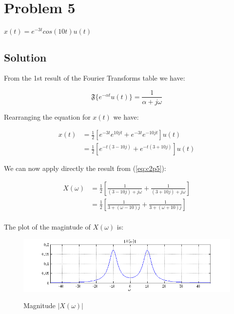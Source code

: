 \section*{Problem 5}

$x(t)=e^{-3t}cos(10t)u(t)$

\subsection*{Solution}

From the 1st result of the Fourier Transforms table we have:

\begin{equation}
\mathfrak{F}\{ e^{-\alpha t} u(t)\} = \frac{1}{\alpha + j \omega} 
\label{eq:c2p5}
\end{equation} 

Rearranging the equation for $x(t)$ we have:

\begin{equation*}
\begin{aligned}
x(t) &= \frac{1}{2} [e^{-3t}e^{10 j t} + e^{-3t}e^{-10 j t}] u(t) \\
     &= \frac{1}{2} [e^{-t(3 - 10j)} + e^{-t(3 + 10j)}] u(t)
\end{aligned}
\end{equation*} 

We can now apply directly the result from (\ref{eq:c2p5}):

\begin{equation*}
\begin{aligned}
X(\omega) &=  \frac{1}{2} \left[
	\frac{1}{(3 - 10j) + j\omega} + 
	\frac{1}{(3 + 10j) + j\omega} \right] \\
          &=  \frac{1}{2} \left[
	\frac{1}{3 + (\omega - 10)j } + 
	\frac{1}{3 + (\omega + 10)j} \right] \\
\end{aligned}
\end{equation*} 

The plot of the magintude of $X(\omega)$ is:

\begin{figure}[H]
\caption{Magnitude $|X(\omega)|$}
\centering
\includegraphics[width=1.0\textwidth]{figs/c2p5a.png}
\label{fig:c2p5a}
\end{figure} 

